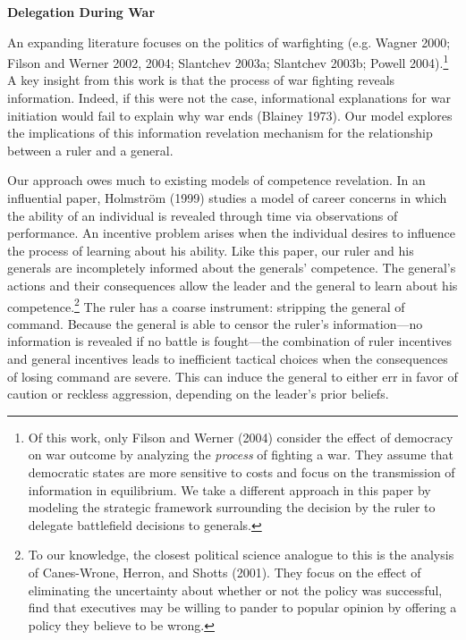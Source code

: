 \documentclass[11pt,]{article}
\begin{document}
\begin{center}
\textbf{\Large{Delegation During War}}\normalsize\\
\end{center}
An expanding literature focuses on the politics of warfighting (e.g. Wagner 2000; Filson and Werner 2002, 2004; Slantchev 2003a; Slantchev 2003b; Powell 2004).\footnote{\normalsize\doublespacing Of this work, only Filson and Werner (2004) consider the effect of democracy on war outcome by analyzing the \textit{process} of fighting a war.  They assume that democratic states are more sensitive to costs and focus on the transmission of information in equilibrium.  We take a different approach in this paper by modeling the strategic framework surrounding the decision by the ruler to delegate battlefield decisions to generals.}  A key insight from this work is that the process of war fighting reveals information.  Indeed, if this were not the case, informational explanations for war initiation would fail to explain why war ends (Blainey 1973).  Our model explores the implications of this information revelation mechanism for the relationship between a ruler and a general.

Our approach owes much to existing models of competence revelation.  In an influential paper, Holmstr\"{o}m (1999) studies a model of career concerns in which the ability of an individual is revealed through time via observations of performance.  An incentive problem arises when the individual desires to influence the process of learning about his ability.  Like this paper, our ruler and his generals are incompletely informed about the generals' competence.  The general's actions and their consequences allow the leader and the general to learn about his competence.\footnote{\normalsize\doublespacing To our knowledge, the closest political science analogue to this is the analysis of Canes-Wrone, Herron, and Shotts (2001).   They focus on the effect of eliminating the uncertainty about whether or not the policy was successful, find that executives may be willing to pander to popular opinion by offering a policy they believe to be wrong.}  The ruler has a coarse instrument: stripping the general of command.  Because the general is able to censor the ruler's information---no information is revealed if no battle is fought---the combination of ruler incentives and general incentives leads to inefficient tactical choices when the consequences of losing command are severe.  This can induce the general to either err in favor of caution or reckless aggression, depending on the leader's prior beliefs.
\end{document}
